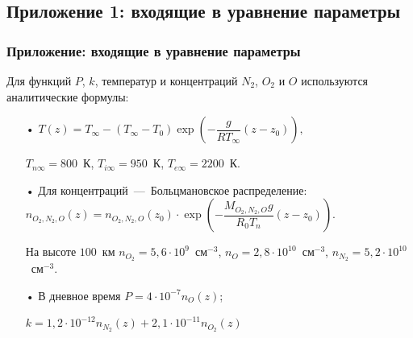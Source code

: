 \documentclass[9pt, apectratio=43,unicode]{beamer}
\begin{document}
\subsection{Приложение 1: входящие в уравнение параметры}
\begin{frame}\frametitle{Приложение: входящие в уравнение параметры}
Для функций $P$, $k$, температур и концентраций $N_2$, $O_2$ и $O$ используются аналитические формулы: 

\begin{itemize}
\item[•] $T(z)=T_\infty - (T_\infty-T_0)\exp\left(-\dfrac{g}{RT_\infty}(z-z_0)\right),$ 

$T_{n\infty}=800$~К, $T_{i\infty}=950$~К, $T_{e\infty}=2200$~К.

\smallskip

\item[•] Для концентраций~---~Больцмановское распределение: $n_{O_2, N_2, O} (z)= n_{O_2, N_2, O} (z_0)\cdot \exp\left(-\dfrac{M_{O_2, N_2, O}g}{R_0T_n}(z-z_0)\right).$ 

На высоте $100$~км $n_{O_2} = 5{,}6\cdot 10^9$~см$^{-3}$, $n_{O} = 2{,}8\cdot 10^{10}$~см$^{-3}$, $n_{N_2} = 5{,}2\cdot 10^{10}$~см$^{-3}$.

\smallskip


\item[•] В дневное время $P=4\cdot10^{-7}n_O(z)$;

$k=1{,}2\cdot10^{-12}n_{N_2}(z)+2{,}1\cdot10^{-11}n_{O_2}(z)$
\end{itemize}

\end{frame}
\end{document}
